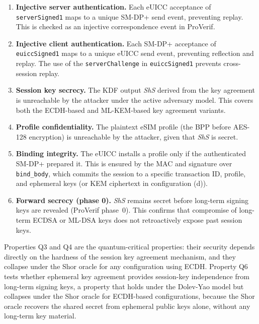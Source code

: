 \documentclass[a4paper,fleqn]{cas-sc}
\begin{document}
\begin{enumerate}[leftmargin=*, noitemsep, topsep=4pt, label=\textbf{Q\arabic*.}]
  \item \textbf{Injective server authentication.} Each eUICC acceptance
        of \texttt{serverSigned1} maps to a unique SM-DP+ send event,
        preventing replay. This is checked as an injective correspondence
        event in ProVerif.
  \item \textbf{Injective client authentication.} Each SM-DP+ acceptance
        of \texttt{euiccSigned1} maps to a unique eUICC send event,
        preventing reflection and replay. The use of the
        \texttt{serverChallenge} in \texttt{euiccSigned1} prevents
        cross-session replay.
  \item \textbf{Session key secrecy.} The KDF output \textit{ShS} derived
        from the key agreement is unreachable by the attacker under the
        active adversary model. This covers both the ECDH-based and
        ML-KEM-based key agreement variants.
  \item \textbf{Profile confidentiality.} The plaintext eSIM profile
        (the BPP before AES-128 encryption) is unreachable by the
        attacker, given that \textit{ShS} is secret.
  \item \textbf{Binding integrity.} The eUICC installs a profile only
        if the authenticated SM-DP+ prepared it. This is ensured by the
        MAC and signature over \texttt{bind\_body}, which commits the
        session to a specific transaction ID, profile, and ephemeral keys
        (or KEM ciphertext in configuration (d)).
  \item \textbf{Forward secrecy (phase 0).} \textit{ShS} remains secret
        before long-term signing keys are revealed (ProVerif phase~0).
        This confirms that compromise of long-term ECDSA or ML-DSA keys
        does not retroactively expose past session keys.
\end{enumerate}

Properties Q3 and Q4 are the quantum-critical properties: their security
depends directly on the hardness of the session key agreement mechanism,
and they collapse under the Shor oracle for any configuration using
ECDH. Property Q6 tests whether ephemeral key agreement provides
session-key independence from long-term signing keys, a property that
holds under the Dolev-Yao model but collapses under the Shor oracle
for ECDH-based configurations, because the Shor oracle recovers the
shared secret from ephemeral public keys alone, without any long-term key
material.
\end{document}
